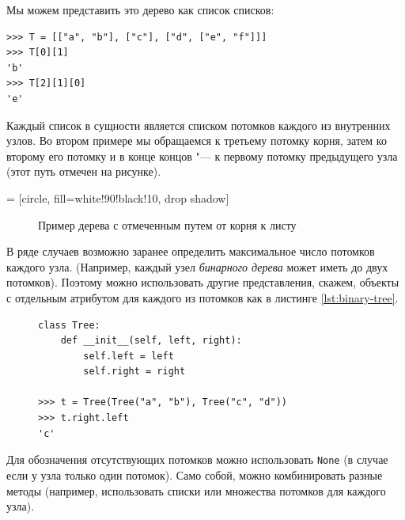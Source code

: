 Мы можем представить это дерево как список списков:
\begin{lstlisting}
>>> T = [["a", "b"], ["c"], ["d", ["e", "f"]]]
>>> T[0][1]
'b'
>>> T[2][1][0]
'e'
\end{lstlisting}

Каждый список в сущности является списком потомков каждого из внутренних узлов. Во втором примере мы обращаемся к третьему потомку корня, затем ко второму его потомку и в конце концов "--- к первому потомку предыдущего узла (этот путь отмечен на рисунке).


 = [circle,
						fill=white!90!black!10,
						drop shadow]
\begin{figure}[h]
\centering
{}
\caption{Пример дерева с отмеченным путем от корня к листу}
\label{fig:simple-tree}
\end{figure}


В ряде случаев возможно заранее определить максимальное число потомков каждого узла. (Например, каждый узел \textit{бинарного дерева} может иметь до двух потомков). Поэтому можно использовать другие представления, скажем, объекты с отдельным атрибутом для каждого из потомков как в листинге \ref{lst:binary-tree}.

\begin{figure}[h!]
\begin{lstlisting}[caption={Класс бинарного дерева и его использование}, label={lst:binary-tree}]
class Tree:
	def __init__(self, left, right):
		self.left = left
		self.right = right

>>> t = Tree(Tree("a", "b"), Tree("c", "d"))
>>> t.right.left
'c'
\end{lstlisting}
\end{figure}
Для обозначения отсутствующих потомков можно использовать \texttt{None} (в случае если у узла только один потомок). Само собой, можно комбинировать разные методы (например, использовать списки или множества потомков для каждого узла).


